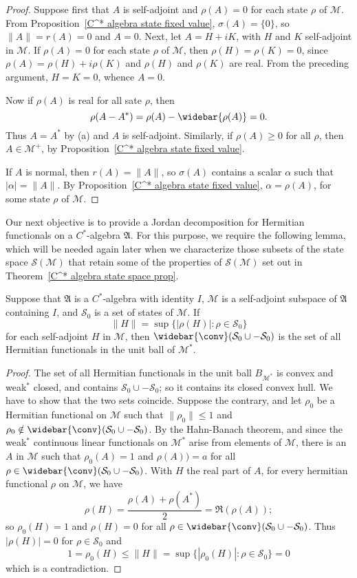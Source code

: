 \begin{proof}
Suppose first that $A$ is self-adjoint and $\rho(A)=0$ for each state $\rho$ of $\mathscr{M}$. From Proposition~\ref{C^* algebra state fixed value}, $\sigma(A)=\{0\}$, so $\|A\|=r(A)=0$ and $A=0$. Next, let $A=H+iK$, with $H$ and $K$ self-adjoint in $\mathscr{M}$. If $\rho(A)=0$ for each state $\rho$ of $\mathscr{M}$, then $\rho(H)=\rho(K)=0$, since $\rho(A)=\rho(H)+i\rho(K)$ and $\rho(H)$ and $\rho(K)$ are real. From the preceding argument, $H=K=0$, whence $A=0$.\par
Now if $\rho(A)$ is real for all sate $\rho$, then
\[\rho(A-A^*)=\rho(A)-\widebar{\rho(A)}=0.\]
Thus $A=A^*$ by (a) and $A$ is self-adjoint. Similarly, if $\rho(A)\geq 0$ for all $\rho$, then $A\in\mathscr{M}^+$, by Proposition~\ref{C^* algebra state fixed value}.\par
If $A$ is normal, then $r(A)=\|A\|$, so $\sigma(A)$ contains a scalar $\alpha$ such that $|\alpha|=\|A\|$. By Proposition~\ref{C^* algebra state fixed value}, $\alpha=\rho(A)$, for some state $\rho$ of $\mathscr{M}$.
\end{proof}
Our next objective is to provide a Jordan decomposition for Hermitian functionals on a $C^*$-algebra $\mathfrak{A}$. For this purpose, we require the following lemma, which will be needed again later when we characterize those subsets of the state space $\mathcal{S}(\mathscr{M})$ that retain some of the properties of $\mathcal{S}(\mathscr{M})$ set out in Theorem~\ref{C^* algebra state space prop}.
\begin{lemma}\label{C^* algebra closed convex hull of norm states}
Suppose that $\mathfrak{A}$ is a $C^*$-algebra with identity $I$, $\mathscr{M}$ is a self-adjoint subspace of $\mathfrak{A}$ containing $I$, and $\mathcal{S}_0$ is a set of states of $\mathscr{M}$. If
\[\|H\|=\sup\{|\rho(H)|:\rho\in\mathcal{S}_0\}\]
for each self-adjoint $H$ in $\mathscr{M}$, then $\widebar{\conv}(\mathcal{S}_0\cup-\mathcal{S}_0)$ is the set of all Hermitian functionals in the unit ball of $\mathscr{M}^*$.
\end{lemma}
\begin{proof}
The set of all Hermitian functionals in the unit ball $B_{\mathscr{M}^*}$ is convex and weak$^*$ closed, and contains $\mathcal{S}_0\cup-\mathcal{S}_0$; so it contains its closed convex hull. We have to show that the two sets coincide. Suppose the contrary, and let $\rho_0$ be a Hermitian functional on $\mathscr{M}$ such that $\|\rho_0\|\leq 1$ and $\rho_0\notin\widebar{\conv}(\mathcal{S}_0\cup-\mathcal{S}_0)$. By the Hahn-Banach theorem, and since the weak$^*$ continuous linear functionals on $\mathscr{M}^*$ arise from elements of $\mathscr{M}$, there is an $A$ in $\mathscr{M}$ such that $\rho_0(A)=1$ and $\rho(A))=a$ for all $\rho\in\widebar{\conv}(\mathcal{S}_0\cup-\mathcal{S}_0)$. With $H$ the real part of $A$, for every hermitian functional $\rho$ on $\mathscr{M}$, we have
\[\rho(H)=\frac{\rho(A)+\rho(A^*)}{2}=\Re(\rho(A));\]
so $\rho_0(H)=1$ and $\rho(H)=0$ for all $\rho\in\widebar{\conv}(\mathcal{S}_0\cup-\mathcal{S}_0)$. Thus $|\rho(H)|=0$ for $\rho\in\mathcal{S}_0$ and 
\[1=\rho_0(H)\leq\|H\|=\sup\{|\rho_0(H)|:\rho\in\mathcal{S}_0\}=0\]
which is a contradiction.
\end{proof}
